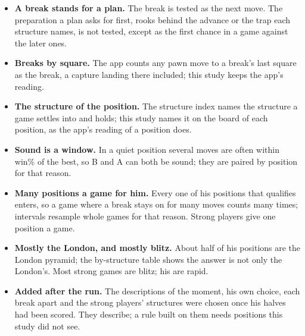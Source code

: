 \documentclass[11pt]{article}
\begin{document}
\begin{itemize}[nosep]
\item \textbf{A break stands for a plan.} The break is tested as the next move. The preparation a
  plan asks for first, rooks behind the advance or the trap each structure names, is not tested,
  except as the first chance in a game against the later ones.
\item \textbf{Breaks by square.} The app counts any pawn move to a break's last square as the
  break, a capture landing there included; this study keeps the app's reading.
\item \textbf{The structure of the position.} The structure index names the structure a game
  settles into and holds; this study names it on the board of each position, as the app's
  reading of a position does.
\item \textbf{Sound is a window.} In a quiet position several moves are often within \Window{}
  win\% of the best, so B and A can both be sound; they are paired by position for that reason.
\item \textbf{Many positions a game for him.} Every one of his positions that qualifies enters,
  so a game where a break stays on for many moves counts many times; intervals resample whole
  games for that reason. Strong players give one position a game.
\item \textbf{Mostly the London, and mostly blitz.} About half of his positions are the London
  pyramid; the by-structure table shows the answer is not only the London's. Most strong games
  are blitz; his are rapid.
\item \textbf{Added after the run.} The descriptions of the moment, his own choice, each break
  apart and the strong players' structures were chosen once his halves had been scored. They
  describe; a rule built on them needs positions this study did not see.
\end{itemize}
\end{document}
